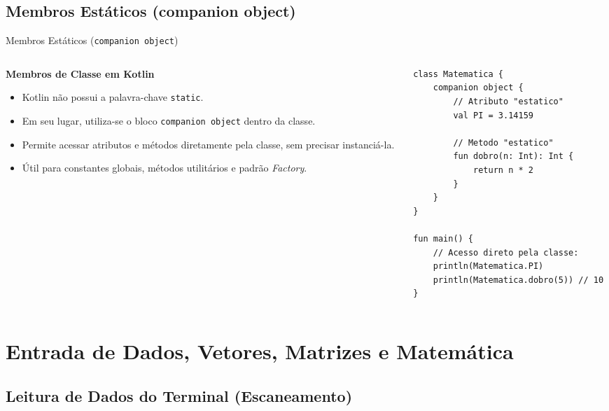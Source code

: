 \documentclass[aspectratio=169]{beamer}
\begin{document}
\subsection{Membros Estáticos (companion object)}

\begin{frame}[fragile]{Membros Estáticos (\texttt{companion object})}
  \begin{columns}[T]
    \begin{column}{0.46\textwidth}
      \textbf{Membros de Classe em Kotlin}
      \vspace{0.3em}
      \begin{itemize}\small
        \item Kotlin não possui a palavra-chave \texttt{static}.
        \item Em seu lugar, utiliza-se o bloco \texttt{companion object} dentro da classe.
        \item Permite acessar atributos e métodos diretamente pela classe, sem precisar instanciá-la.
        \item Útil para constantes globais, métodos utilitários e padrão \textit{Factory}.
      \end{itemize}
    \end{column}
    \begin{column}{0.51\textwidth}
\begin{lstlisting}[style=KotlinStyle]
class Matematica {
    companion object {
        // Atributo "estatico"
        val PI = 3.14159

        // Metodo "estatico"
        fun dobro(n: Int): Int {
            return n * 2
        }
    }
}

fun main() {
    // Acesso direto pela classe:
    println(Matematica.PI)
    println(Matematica.dobro(5)) // 10
}
\end{lstlisting}
    \end{column}
  \end{columns}
\end{frame}

\section{Entrada de Dados, Vetores, Matrizes e Matemática}

\subsection{Leitura de Dados do Terminal (Escaneamento)}
\end{document}
